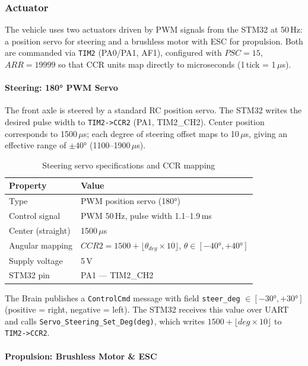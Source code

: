 \documentclass[12pt,a4paper]{article}
\begin{document}
\subsubsection{Actuator}

The vehicle uses two actuators driven by PWM signals from the STM32 at 50\,Hz:
a position servo for steering and a brushless motor with ESC for propulsion.
Both are commanded via \texttt{TIM2} (PA0/PA1, AF1), configured with \(PSC=15\), \(ARR=19999\)
so that CCR units map directly to microseconds (1\,tick = 1\,\(\mu\)s).

\paragraph{Steering: 180° PWM Servo}

The front axle is steered by a standard RC position servo.
The STM32 writes the desired pulse width to \texttt{TIM2->CCR2} (PA1, TIM2\_CH2).
Center position corresponds to 1500\,\(\mu\)s; each degree of steering offset maps to
10\,\(\mu\)s, giving an effective range of \(\pm40°\) (1100--1900\,\(\mu\)s).

\begin{table}[H]
\centering
\begin{tabular}{ll}
\hline
\textbf{Property} & \textbf{Value} \\
\hline
Type           & PWM position servo (180°) \\
Control signal & PWM 50\,Hz, pulse width 1.1--1.9\,ms \\
Center (straight) & 1500\,\(\mu\)s \\
Angular mapping & \(CCR2 = 1500 + \lfloor \theta_{deg} \times 10 \rfloor\), \(\theta \in [-40°,+40°]\) \\
Supply voltage & 5\,V \\
STM32 pin      & PA1 — TIM2\_CH2 \\
\hline
\end{tabular}
\caption{Steering servo specifications and CCR mapping}
\end{table}

The Brain publishes a \texttt{ControlCmd} message with field \texttt{steer\_deg} \(\in [-30°, +30°]\)
(positive = right, negative = left).
The STM32 receives this value over UART and calls
\texttt{Servo\_Steering\_Set\_Deg(deg)}, which writes \(1500 + \lfloor deg \times 10 \rfloor\)
to \texttt{TIM2->CCR2}.

\paragraph{Propulsion: Brushless Motor \& ESC}
\end{document}
